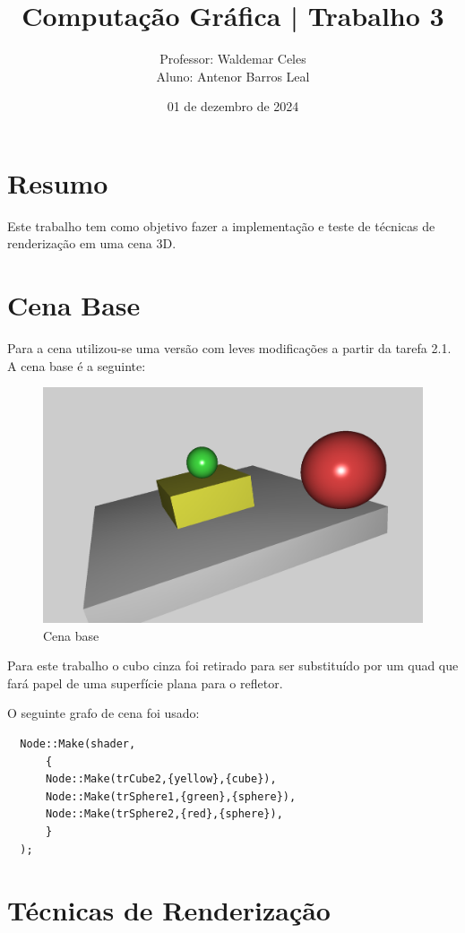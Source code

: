 \documentclass[11pt, a4paper]{article}
\title{Computação Gráfica | Trabalho 3}
\author{Professor: Waldemar Celes\\
Aluno: Antenor Barros Leal}
\date{01 de dezembro de 2024}
\begin{document}
\maketitle

\section {Resumo}
Este trabalho tem como objetivo fazer a implementação e teste de técnicas de renderização
em uma cena 3D.

\section {Cena Base}
Para a cena utilizou-se uma versão com leves modificações a partir da tarefa 2.1. 
A cena base é a seguinte:

\begin{figure}[H]
  \begin{center}
  \includegraphics[width=0.8\linewidth]{base-scene.png}
  \caption{Cena base}
  \label{fig:cena-base}
  \end{center}
\end{figure}

Para este trabalho o cubo cinza foi retirado para ser substituído por um quad 
que fará papel de uma superfície plana para o refletor.

O seguinte grafo de cena foi usado:

\begin{verbatim}
  Node::Make(shader,
      {
      Node::Make(trCube2,{yellow},{cube}),
      Node::Make(trSphere1,{green},{sphere}),
      Node::Make(trSphere2,{red},{sphere}),
      }
  );
\end{verbatim}

\section {Técnicas de Renderização}
\end{document}
